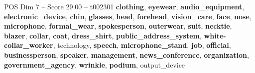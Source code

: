 \begin{textsample}{POS Dim 7 – Score 29.00 – t002301}  \label{ex:f7_pos_007}
\textbf{clothing}, \textbf{eyewear}, \textbf{audio\_equipment}, \textbf{electronic\_device}, \textbf{chin}, \textbf{glasses}, \textbf{head}, \textbf{forehead}, \textbf{vision\_care}, \textbf{face}, \textbf{nose}, \textbf{microphone}, \textbf{formal\_wear}, \textbf{spokesperson}, \textbf{outerwear}, \textbf{suit}, \textbf{necktie}, \textbf{blazer}, \textbf{collar}, \textbf{coat}, \textbf{dress\_shirt}, \textbf{public\_address\_system}, \textbf{white-collar\_worker}, technology, \textbf{speech}, \textbf{microphone\_stand}, \textbf{job}, \textbf{official}, \textbf{businessperson}, \textbf{speaker}, \textbf{management}, \textbf{news\_conference}, \textbf{organization}, \textbf{government\_agency}, \textbf{wrinkle}, \textbf{podium}, output\_device

\end{textsample}
